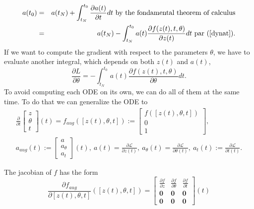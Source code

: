 \documentclass[10pt,a4paper]{article}
\theoremstyle{definition}
\theoremstyle{definition}
\theoremstyle{definition}
\begin{document}
\begin{eqnarray*}
a(t_0) &=& a(t_N) + \int^{t_0}_{t_N} \frac{\partial a(t)}{\partial t} dt \text{ by the fondamental theorem of calculus}\\
	   &=& a(t_N) - \int^{t_0}_{t_N} a(t) \frac{\partial f(z(t),t,\theta)} {\partial z(t)} dt \text{ par (\ref{dynat})}.
\end{eqnarray*}
If we want to compute the gradient with respect to the parameters $\theta$, we have to evaluate another integral, which depends on both $z(t)$ and $a(t)$,
\begin{equation}
\label{devtheta}
\frac{\partial L}{\partial \theta} = - \int^{t_0}_{t_N} a(t) \frac{\partial f(z(t),t,\theta)} {\partial \theta} dt.
\end{equation}
To avoid computing each ODE on its own, we can do all of them at the same time. To do that we can generalize the ODE to
\begin{eqnarray*}
\frac{\partial}{\partial t} \begin{bmatrix}
							z \\ \theta \\ t
							\end{bmatrix} (t) 
= f_{aug}([z(t),\theta ,t]) := \begin{bmatrix}
							f([z(t),\theta ,t]) \\ 0 \\ 1
							\end{bmatrix}, \\
a_{aug} (t) := \begin{bmatrix}
			a \\ a_{\theta} \\ a_t
			\end{bmatrix} (t) , \ 
a(t) = \frac{\partial \mathcal{L}}{\partial z(t)}, \ 
a_\theta (t) = \frac{\partial \mathcal{L}}{\partial \theta (t)}, \ 
a_t(t) := \frac{\partial \mathcal{L}}{\partial t(t)}.
\end{eqnarray*}

The jacobian of $f$ has the form
\begin{equation*}
\frac{\partial f_{aug}}{\partial [z(t),\theta,t]}([z(t),\theta,t]) = \begin{bmatrix}
\frac{\partial f}{\partial z} & \frac{\partial f}{\partial \theta} & \frac{\partial f}{\partial t} \\
\textbf{0} & \textbf{0} & \textbf{0} \\
\textbf{0} & \textbf{0} & \textbf{0}
\end{bmatrix}(t)
\end{equation*}
\end{document}
